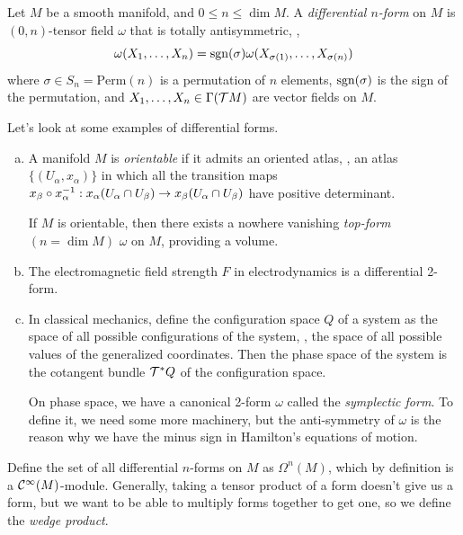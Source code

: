 \begin{definition}
    Let \(M\) be a smooth manifold, and \(0 \le n \le \dim M\). A \emph{differential \(n\)-form} on \(M\) is \((0, n)\)-tensor field \(\omega\) that is totally antisymmetric, \ie,
    \begin{equation*}
        \omega(X_1, \ldots, X_n) = \operatorname{sgn}(\sigma) \omega(X_{\sigma(1)}, \ldots, X_{\sigma(n)})
    \end{equation*}
    where \(\sigma \in S_n = \text{Perm}(n)\) is a permutation of \(n\) elements, \(\operatorname{sgn}(\sigma)\) is the sign of the permutation, and \(X_1, \ldots, X_n \in \Gamma(\mathcal T M)\) are vector fields on \(M\).
\end{definition}
Let's look at some examples of differential forms.
\begin{example}
    \phantom{l}\vspace{-1.5em}
    \begin{enumerate}[a)]
        \item A manifold \(M\) is \emph{orientable} if it admits an oriented atlas, \ie, an atlas \(\{(U_\alpha, x_\alpha)\}\) in which all the transition maps \(x_\beta \circ x_\alpha^{-1}: x_\alpha(U_\alpha \cap U_\beta) \to x_\beta(U_\alpha \cap U_\beta)\) have positive determinant.

              If \(M\) is orientable, then there exists a nowhere vanishing \emph{top-form} \((n = \dim M)\) \(\omega\) on \(M\), providing a volume.

        \item The electromagnetic field strength \(F\) in electrodynamics is a differential 2-form.

        \item In classical mechanics, define the configuration space \(Q\) of a system as the space of all possible configurations of the system, \ie, the space of all possible values of the generalized coordinates. Then the phase space of the system is the cotangent bundle \(\mathcal T^* Q\) of the configuration space.

              On phase space, we have a canonical 2-form \(\omega\) called the \emph{symplectic form}. To define it, we need some more machinery, but the anti-symmetry of \(\omega\) is the reason why we have the minus sign in Hamilton's equations of motion.
    \end{enumerate}
\end{example}
Define the set of all differential \(n\)-forms on \(M\) as \(\Omega^n(M)\), which by definition is a  \(\mathcal C^\infty(M)\)-module. Generally, taking a tensor product of a form doesn't give us a form, but we want to be able to multiply forms together to get one, so we define the \emph{wedge product}.
